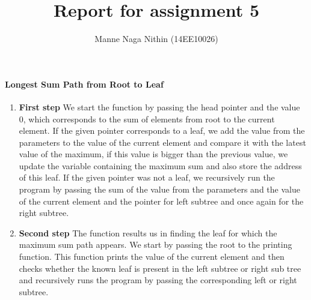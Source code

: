 \documentclass[a4paper,11pt]{article}
\title{Report for assignment 5}
\author{Manne Naga Nithin (14EE10026)}
\begin{document}
\maketitle

\paragraph{Longest Sum Path from Root to Leaf}
\begin{enumerate}
 \item \textbf{First step}\newline
We start the function by passing the head pointer and the value 0, which corresponds to the sum of elements from root to the current element.\newline
If the given pointer corresponds to a leaf, we add the value from the parameters to the value of the current element and compare it with the latest value of the maximum, if this value is bigger than the previous value, we update the variable containing the maximum sum and also store the address of this leaf.\newline
If the given pointer was not a leaf, we recursively run the program by passing the sum of the value from the parameters and the value of the current element and the pointer for left subtree and once again for the right subtree.\newline
 \item \textbf{Second step}\newline
The function results us in finding the leaf for which the maximum sum path appears.\newline
We start by passing the root to the printing function. This function prints the value of the current element and then checks whether the known leaf is present in the left subtree or right sub tree  and recursively runs the program by passing the corresponding left or right subtree.\newline
\end{enumerate}
\end{document}
